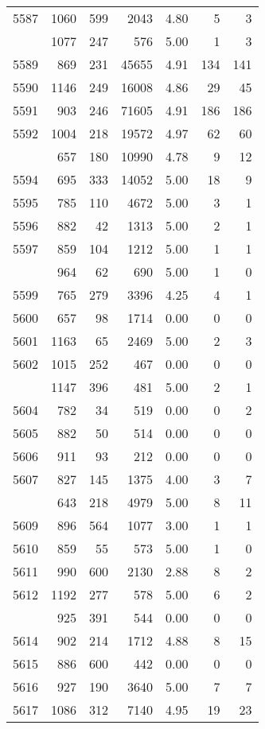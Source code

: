 \documentclass[
]{article}
\begin{document}
\begin{table}
\begin{tabular}[t]{lrrrrrr}
5587 & 1060 & 599 & 2043 & 4.80 & 5 & 3\\
\addlinespace
5588 & 1077 & 247 & 576 & 5.00 & 1 & 3\\
5589 & 869 & 231 & 45655 & 4.91 & 134 & 141\\
5590 & 1146 & 249 & 16008 & 4.86 & 29 & 45\\
5591 & 903 & 246 & 71605 & 4.91 & 186 & 186\\
5592 & 1004 & 218 & 19572 & 4.97 & 62 & 60\\
\addlinespace
5593 & 657 & 180 & 10990 & 4.78 & 9 & 12\\
5594 & 695 & 333 & 14052 & 5.00 & 18 & 9\\
5595 & 785 & 110 & 4672 & 5.00 & 3 & 1\\
5596 & 882 & 42 & 1313 & 5.00 & 2 & 1\\
5597 & 859 & 104 & 1212 & 5.00 & 1 & 1\\
\addlinespace
5598 & 964 & 62 & 690 & 5.00 & 1 & 0\\
5599 & 765 & 279 & 3396 & 4.25 & 4 & 1\\
5600 & 657 & 98 & 1714 & 0.00 & 0 & 0\\
5601 & 1163 & 65 & 2469 & 5.00 & 2 & 3\\
5602 & 1015 & 252 & 467 & 0.00 & 0 & 0\\
\addlinespace
5603 & 1147 & 396 & 481 & 5.00 & 2 & 1\\
5604 & 782 & 34 & 519 & 0.00 & 0 & 2\\
5605 & 882 & 50 & 514 & 0.00 & 0 & 0\\
5606 & 911 & 93 & 212 & 0.00 & 0 & 0\\
5607 & 827 & 145 & 1375 & 4.00 & 3 & 7\\
\addlinespace
5608 & 643 & 218 & 4979 & 5.00 & 8 & 11\\
5609 & 896 & 564 & 1077 & 3.00 & 1 & 1\\
5610 & 859 & 55 & 573 & 5.00 & 1 & 0\\
5611 & 990 & 600 & 2130 & 2.88 & 8 & 2\\
5612 & 1192 & 277 & 578 & 5.00 & 6 & 2\\
\addlinespace
5613 & 925 & 391 & 544 & 0.00 & 0 & 0\\
5614 & 902 & 214 & 1712 & 4.88 & 8 & 15\\
5615 & 886 & 600 & 442 & 0.00 & 0 & 0\\
5616 & 927 & 190 & 3640 & 5.00 & 7 & 7\\
5617 & 1086 & 312 & 7140 & 4.95 & 19 & 23\\

\end{tabular}
\end{table}
\end{document}
